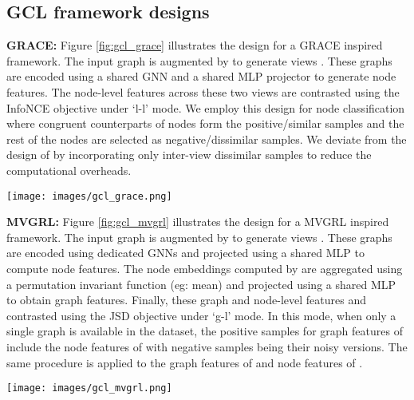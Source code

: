 \documentclass{article}
\theoremstyle{plain}
\theoremstyle{definition}
\theoremstyle{remark}
\begin{document}
\subsection{GCL framework designs}

\textbf{GRACE:} Figure \ref{fig:gcl_grace} illustrates the design for a GRACE \citep{zhu2020deep} inspired framework. The input graph  is augmented by  to generate views . These graphs are encoded using a shared GNN  and a shared MLP projector  to generate node features. The node-level features across these two views are contrasted using the InfoNCE objective under `l-l' mode. We employ this design for node classification where congruent counterparts of nodes form the positive/similar samples and the rest of the nodes are selected as negative/dissimilar samples. We deviate from the design of \citet{zhu2020deep} by incorporating only inter-view dissimilar samples to reduce the computational overheads.

\begin{figure*}[ht]
\vskip 0.2in
\begin{center}
\centerline{\texttt{[image: images/gcl\_grace.png]}}
\caption{GRACE design with shared encoder , shared node feature projector , l-l contrastive mode and InfoNCE objective.} 
\label{fig:gcl_grace}
\end{center}
\vskip -0.2in
\end{figure*}

\textbf{MVGRL:} Figure \ref{fig:gcl_mvgrl} illustrates the design for a MVGRL \citep{hassani2020contrastive} inspired framework. The input graph  is augmented by  to generate views . These graphs are encoded using dedicated GNNs  and projected using a shared MLP  to compute node features. The node embeddings computed by  are aggregated using a permutation invariant function  (eg: mean) and projected using a shared MLP  to obtain graph features. Finally, these graph and node-level features and contrasted using the JSD objective under `g-l' mode. In this mode, when only a single graph  is available in the dataset, the positive samples for graph features of  include the node features of  with negative samples being their noisy versions. The same procedure is applied to the graph features of  and node features of  \citep{velickovic2019deep, hassani2020contrastive, zhu2021empirical}.

\begin{figure*}[ht]
\vskip 0.2in
\begin{center}
\centerline{\texttt{[image: images/gcl\_mvgrl.png]}}
\caption{MVGRL design with dedicated encoders , shared node feature projector , shared graph feature projector , g-l contrastive mode and JSD objective.} 
\label{fig:gcl_mvgrl}
\end{center}
\vskip -0.2in
\end{figure*}
\end{document}
